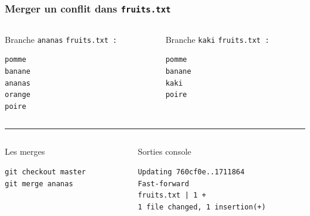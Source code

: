 \documentclass[table,tikz,12pt,svgnames]{beamer}
\begin{document}
\begin{frame}[fragile]
\frametitle{Merger un conflit dans \texttt{fruits.txt}}
\vspace{-0.2em}
\begin{columns}[T] %
	\begin{column}{.45\textwidth}
		\color{darkgreen}
		Branche \texttt{ananas}
		\texttt{fruits.txt :}
		\color{black}
		\begin{verbatim}
pomme
banane
ananas
orange
poire
		\end{verbatim}
	\end{column}%
	\begin{column}{.45\textwidth}
		\color{blue}%
		Branche \texttt{kaki}
		\texttt{fruits.txt :}		
		\color{black}
\begin{verbatim}
pomme
banane
kaki
poire
\end{verbatim}
\end{column}%
\end{columns}

\color{gray}\rule{\linewidth}{3pt}
\color{black}
\vspace{-0.82em}

\PAUSE

\begin{adjustwidth}{0.4cm}{-1cm}{}
	\vspace{-0.48em}
	\begin{columns}[T] %
		\begin{column}{.45\textwidth}
			\color{darkgreen}%
			Les merges
			\color{black}
			\begin{verbatim}
git checkout master
git merge ananas
			\end{verbatim}
		\end{column}%
		\hfill%
		\begin{column}{.6\textwidth}
			\color{darkgreen}%
			Sorties console
			\color{black}
			\vspace{-1em}
			\begin{verbatim}
Updating 760cf0e..1711864
Fast-forward
fruits.txt | 1 +
1 file changed, 1 insertion(+)
			\end{verbatim}
		\end{column}%
	\end{columns}


\end{adjustwidth}
\end{frame}
\end{document}
